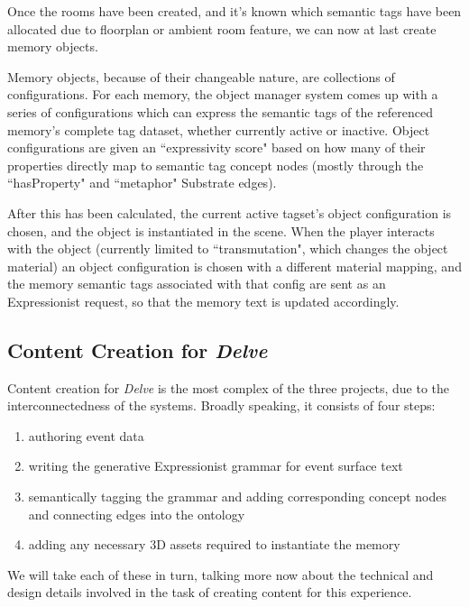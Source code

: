 
Once the rooms have been created, and it's known which semantic tags have been allocated due to floorplan or ambient room feature, we can now at last create memory objects.

Memory objects, because of their changeable nature, are collections of configurations. For each memory, the object manager system comes up with a series of configurations which can express the semantic tags of the referenced memory's complete tag dataset, whether currently active or inactive. Object configurations are given an ``expressivity score" based on how many of their properties directly map to semantic tag concept nodes (mostly through the ``hasProperty" and ``metaphor" Substrate edges).

After this has been calculated, the current active tagset's object configuration is chosen, and the object is instantiated in the scene. When the player interacts with the object (currently limited to ``transmutation", which changes the object material) an object configuration is chosen with a different material mapping, and the memory semantic tags associated with that config are sent as an Expressionist request, so that the memory text is updated accordingly.

\subsection{Content Creation for \textit{Delve}}\label{subsec:content-creation-for-delve}

Content creation for \textit{Delve} is the most complex of the three projects, due to the interconnectedness of the systems. Broadly speaking, it consists of four steps: 
\newline
\begin{enumerate}
    \item authoring event data
    \item writing the generative Expressionist grammar for event surface text
    \item semantically tagging the grammar and adding corresponding concept nodes and connecting edges into the ontology
    \item adding any necessary 3D assets required to instantiate the memory
\end{enumerate}

We will take each of these in turn, talking more now about the technical and design details involved in the task of creating content for this experience.

